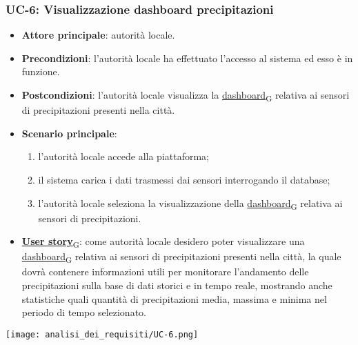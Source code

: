 \subsubsection{UC-6: Visualizzazione dashboard precipitazioni}
\begin{itemize}
	\item \textbf{Attore principale}: autorità locale.
	\item \textbf{Precondizioni}: l'autorità locale ha effettuato l'accesso al sistema ed esso è in funzione.
	\item \textbf{Postcondizioni}: l'autorità locale visualizza la \href{https://7last.github.io/docs/rtb/documentazione-interna/glossario\#dashboard}{dashboard\textsubscript{G}} relativa
	      ai sensori di precipitazioni presenti nella città.
	\item \textbf{Scenario principale}:
	      \begin{enumerate}
		      \item l'autorità locale accede alla piattaforma;
		      \item il sistema carica i dati trasmessi dai sensori interrogando il database;
		      \item l'autorità locale seleziona la visualizzazione della \href{https://7last.github.io/docs/rtb/documentazione-interna/glossario\#dashboard}{dashboard\textsubscript{G}} relativa ai sensori di precipitazioni.
	      \end{enumerate}
	\item \href{https://7last.github.io/docs/rtb/documentazione-interna/glossario\#user-story}{\textbf{User story}\textsubscript{G}}:
	      come autorità locale desidero poter visualizzare una \href{https://7last.github.io/docs/rtb/documentazione-interna/glossario\#dashboard}{dashboard\textsubscript{G}} relativa ai sensori di precipitazioni presenti nella città, la quale
	      dovrà contenere informazioni utili per monitorare l'andamento delle precipitazioni sulla base di dati storici e in tempo reale, mostrando
	      anche statistiche quali quantità di precipitazioni media, massima e minima nel periodo di tempo selezionato.
\end{itemize}
\begin{center}
	\texttt{[image: analisi\_dei\_requisiti/UC-6.png]}
\end{center}

